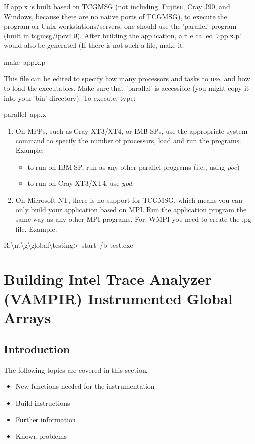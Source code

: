If app.x is built based on TCGMSG (not including, Fujitsu, Cray J90,
and Windows, because there are no native ports of TCGMSG), to execute
the program on Unix workstations/servers, one should use the 'parallel'
program (built in tcgmsg/ipcv4.0). After building the application,
a file called 'app.x.p' would also be generated (If there is not such
a file, make it: 
\begin{lyxcode}
make~app.x.p
\end{lyxcode}
This file can be edited to specify how many processors and tasks to
use, and how to load the executables. Make sure that 'parallel' is
accessible (you might copy it into your 'bin' directory). To execute,
type:
\begin{lyxcode}
parallel~app.x~\end{lyxcode}
\begin{enumerate}
\item On MPPs, such as Cray XT3/XT4, or IMB SPs, use the appropriate system
command to specify the number of processors, load and run the programs.
Example: 

\begin{itemize}
\item to run on IBM SP, run as any other parallel programs (i.e., using
\emph{poe}) 
\item to run on Cray XT3/XT4, use \emph{yod}.
\end{itemize}
\item On Microsoft NT, there is no support for TCGMSG, which means you can
only build your application based on MPI. Run the application program
the same way as any other MPI programs. For, WMPI you need to create
the .pg file. Example: \end{enumerate}
\begin{lyxcode}
R:\textbackslash{}nt\textbackslash{}g\textbackslash{}global\textbackslash{}testing>~start~/b~test.exe
\end{lyxcode}

\section{Building Intel Trace Analyzer (VAMPIR) Instrumented Global Arrays}


\subsection{Introduction}

The following topics are covered in this section.
\begin{itemize}
\item New functions needed for the instrumentation 
\item Build instructions 
\item Further information 
\item Known problems
\end{itemize}

